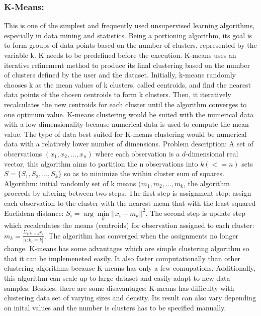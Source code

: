 \documentclass[a4paper,12pt]{report}
\begin{document}
    \subsubsection{K-Means:} 
    This is one of the simplest and frequently used unsupervised learning algorithms, especially in data mining and statistics. Being a portioning algorithm, its goal is to form groups of data points based on the number of clusters, represented by the variable k. K needs to be predefined before the execution. K-means uses an iterative refinement method to produce its final clustering based on the number of clusters defined by the user and the dataset. Initially, k-means randomly chooses k as the mean values of k clusters, called centroids, and find the nearest data points of the chosen centroids to form k clusters. Then, it iteratively recalculates the new centroids for each cluster until the algorithm converges to one optimum value. K-means clustering would be suited with the numerical data with a low dimensionality because numerical data is used to compute the mean value. The type of data best suited for K-means clustering would be numerical data with a relatively lower number of dimensions.
    \newline
    Problem description: A set of observations $(x_1, x_2, …, x_n)$ where each observation is a $d$-dimensional real vector, this algorithm aims to partition the n observations into $k(<=n)$ sets $S = \{S_1, S_2, …, S_k\}$ so as to minimize the within cluster sum of squares.
    \newline
    Algorithm: initial randomly set of k means $(m_1, m_2, …, m_k$, the algorithm proceeds by altering between two steps.
    The first step is assignment step: assign each observation to the cluster with the nearest mean that with the least squared Euclidean distance:
    $S_i = \arg\min\limits_k||x_i - m_k||^2$. 
    The second step is update step which recalculates the means (centroids) for observation assigned to each cluster:
    $m_k = \frac{\Sigma_{i:k_i=k}x_i}{|i:k_i=k|}$.
    The algorithm has converged when the assignments no longer change.
    \newline
    K-means has some advantages which are simple clustering algorithm so that it can be implemeneted easily. It also faster computationally than other clustering algorithms because K-means has only a few comupations.
    Additionally, this algorithm can scale up to large dataset and easily adapt to new data samples.
    Besides, there are some disavantages: K-means has difficulty with clustering data set of varying sizes and density. Its result can also vary depending on inital values and the number is clusters has to be specified manually.    
\end{document}
